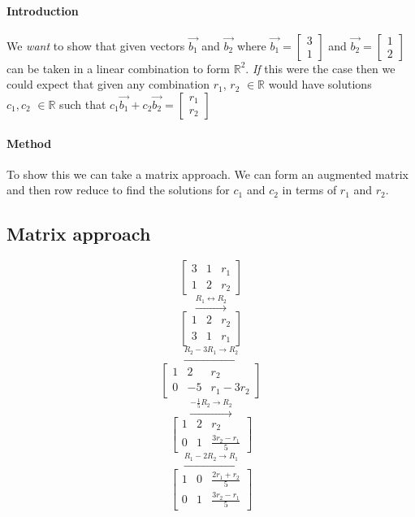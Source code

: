 \documentclass{article}
\begin{document}
        \paragraph{Introduction}We \emph{want} to show that given vectors $\vec{b_1}$ and $\vec{b_2}$ 
        where $\vec{b_1}=\begin{bmatrix}3\\1\end{bmatrix}$ and $\vec{b_2}=\begin{bmatrix}1\\2\end{bmatrix}$
        can be taken in a linear combination to form $\mathbb{R}^2$. \emph{If} this were the case then we could expect
        that given any combination $r_1$, $r_2$ $\in \mathbb{R}$ would have solutions\\ $c_1, c_2$ $\in \mathbb{R}$ such that
        $c_1\vec{b_1}+c_2\vec{b_2}=\begin{bmatrix}r_1\\r_2\end{bmatrix}$
        \paragraph{Method}To show this we can take a matrix approach. We can form an augmented matrix
        and then row reduce to find the solutions for $c_1$ and $c_2$ in terms of $r_1$ and $r_2$.
    \subsection{Matrix approach}
        \[\left[\begin{array}{cc|c}
        3 & 1 & r_1 \\
        1 & 2 & r_2
        \end{array}\right]\]
        \[\xrightarrow{R_1 \leftrightarrow R_2}\]
        \[\left[\begin{array}{cc|c}
        1 & 2 & r_2 \\
        3 & 1 & r_1
        \end{array}\right]\]
        \[\xrightarrow{R_2 - 3R_1 \rightarrow R_2}\]
        \[\left[\begin{array}{cc|c}
        1 & 2 & r_2 \\
        0 & -5 & r_1 - 3r_2
        \end{array}\right]\]
        \[\xrightarrow{-\frac{1}{5}R_2 \rightarrow R_2}\]
        \[\left[\begin{array}{cc|c}
        1 & 2 & r_2 \\
        0 & 1 & \frac{3r_2 - r_1}{5}
        \end{array}\right]\]
        \[\xrightarrow{R_1 - 2R_2 \rightarrow R_1}\]
        \[\left[\begin{array}{cc|c}
        1 & 0 & \frac{2r_1 + r_2}{5} \\
        0 & 1 & \frac{3r_2 - r_1}{5}
        \end{array}\right]\]
\end{document}

